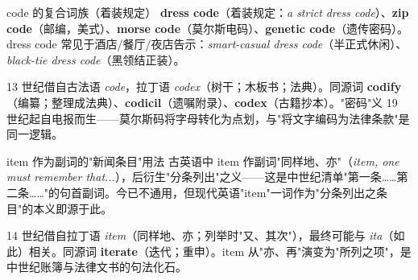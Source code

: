 \documentclass[../main.tex]{subfiles}
\begin{document}
\begin{gram}{code 的复合词族（着装规定）}
\textbf{dress code}（着装规定：\textit{a strict dress code}）、\textbf{zip code}（邮编，美式）、\textbf{morse code}（莫尔斯电码）、\textbf{genetic code}（遗传密码）。dress code 常见于酒店/餐厅/夜店告示：\textit{smart-casual dress code}（半正式休闲）、\textit{black-tie dress code}（黑领结正装）。
\end{gram}

\begin{origin}
13 世纪借自古法语 \textit{code}，拉丁语 \textit{codex}（树干；木板书；法典）。同源词 \textbf{codify}（编纂；整理成法典）、\textbf{codicil}（遗嘱附录）、\textbf{codex}（古籍抄本）。"密码"义 19 世纪起自电报而生——莫尔斯码将字母转化为点划，与"将文字编码为法律条款"是同一逻辑。
\end{origin}




\begin{gram}{item 作为副词的"新闻条目"用法}
古英语中 item 作副词"同样地、亦"（\textit{item, one must remember that...}），后衍生"分条列出"之义——这是中世纪清单"第一条……第二条……"的句首副词。今已不通用，但现代英语"item"一词作为"分条列出之条目"的本义即源于此。
\end{gram}

\begin{origin}
14 世纪借自拉丁语 \textit{item}（同样地、亦；列举时"又、其次"），最终可能与 \textit{ita}（如此）相关。同源词 \textbf{iterate}（迭代；重申）。item 从"亦、再"演变为"所列之项"，是中世纪账簿与法律文书的句法化石。
\end{origin}



\end{document}
